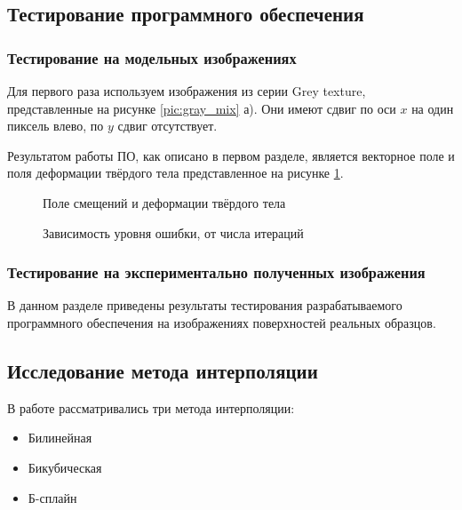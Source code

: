 

\subsection{Тестирование программного обеспечения}
\subsubsection{Тестирование на модельных изображениях}

Для первого раза используем изображения из серии Grey texture, представленные на рисунке \ref{pic:gray_mix} а). Они имеют сдвиг по оси $x$ на один пиксель влево, по $y$ сдвиг отсутствует.

Результатом работы ПО, как описано в первом разделе, является векторное поле и поля деформации твёрдого тела представленное на рисунке \ref{pic:gray_set_out}.

\begin{figure}[h!]
\caption{Поле смещений и деформации твёрдого тела}
\label{pic:gray_set_out}
\end{figure}

\begin{figure}[h!]
\caption{Зависимость уровня ошибки, от числа итераций}
\label{pic:gray_set_func_iteration}
\end{figure}

\subsubsection{Тестирование на экспериментально полученных изображения}
В данном разделе приведены результаты тестирования разрабатываемого программного обеспечения на изображениях поверхностей реальных образцов.

\subsection{Исследование метода интерполяции}
В работе рассматривались три метода интерполяции:
\begin{itemize}
\item Билинейная
\item Бикубическая
\item Б-сплайн
\end{itemize}

